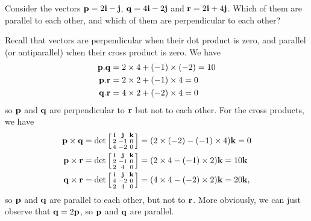 \documentclass[a4paper]{amsart}
\renewenvironment{solution}{\SolutionInline}{\endSolutionInline}
\begin{document}
\begin{exercise}
 Consider the vectors $\mathbf{p}=2\mathbf{i}-\mathbf{j}$, $\mathbf{q}=4\mathbf{i}-2\mathbf{j}$ and
 $\mathbf{r}=2\mathbf{i}+4\mathbf{j}$.  Which of them are parallel to each other, and which
 of them are perpendicular to each other?
\end{exercise}
\begin{solution}
 Recall that vectors are perpendicular when their dot product is zero,
 and parallel (or antiparallel) when their cross product is zero.  We
 have 
 \begin{align*}
  \mathbf{p}.\mathbf{q} &= 2\times 4+(-1)\times(-2)=10 \\
  \mathbf{p}.\mathbf{r} &= 2\times 2 + (-1)\times 4 = 0 \\
  \mathbf{q}.\mathbf{r} &= 4\times 2+(-2)\times 4 = 0
 \end{align*}
 so $\mathbf{p}$ and $\mathbf{q}$ are perpendicular to $\mathbf{r}$ but not to each other.
 For the cross products, we have
 \begin{align*}
  \mathbf{p}\times\mathbf{q} &= \det\left[\begin{smallmatrix} \mathbf{i}&\mathbf{j}&\mathbf{k} \\ 2&-1&0 \\ 4&-2&0 \end{smallmatrix}\right]
   = (2\times(-2)-(-1)\times 4)\mathbf{k} = 0 \\
  \mathbf{p}\times\mathbf{r} &= \det\left[\begin{smallmatrix} \mathbf{i}&\mathbf{j}&\mathbf{k} \\ 2&-1&0 \\ 2&4&0 \end{smallmatrix}\right]
   = (2\times 4-(-1)\times 2)\mathbf{k} = 10\mathbf{k} \\
  \mathbf{q}\times\mathbf{r} &= \det\left[\begin{smallmatrix} \mathbf{i}&\mathbf{j}&\mathbf{k} \\ 4&-2&0 \\ 2&4&0 \end{smallmatrix}\right]
   = (4\times 4-(-2)\times 2)\mathbf{k} = 20\mathbf{k},
 \end{align*}
 so $\mathbf{p}$ and $\mathbf{q}$ are parallel to each other, but not to $\mathbf{r}$.
 More obviously, we can just observe that $\mathbf{q}=2\mathbf{p}$, so $\mathbf{p}$ and
 $\mathbf{q}$ are parallel.
\end{solution}
\end{document}
